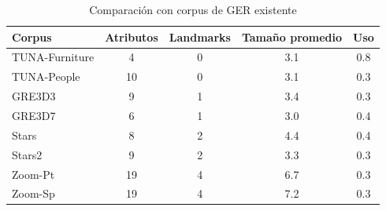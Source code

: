 \begin{table}[H]
\begin{center}
\footnotesize{

\begin{tabular} {  l c c c c}
\hline
Corpus											& Atributos			& Landmarks			& Tama\~{n}o promedio	& Uso \\
\hline
TUNA-Furniture							& 4								& 0							& 3.1				& 0.8   \\
TUNA-People									& 10							& 0							& 3.1				& 0.3   \\
GRE3D3											& 9								& 1							& 3.4				& 0.3   \\
GRE3D7											& 6								& 1							& 3.0				& 0.4   \\
Stars												& 8								& 2							& 4.4				& 0.4   \\
Stars2											& 9								& 2							& 3.3				& 0.3   \\
Zoom-Pt											& 19							& 4							& 6.7				& 0.3   \\
Zoom-Sp											& 19							& 4							& 7.2				& 0.3   \\
\hline
\end{tabular}
}
\end{center}
\caption{Comparaci\'on con corpus de GER existente}
\label{tab-comparison}
\end{table}



%
%

